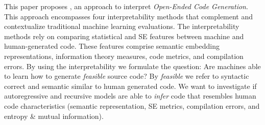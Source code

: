 This paper proposes \CodeGenXplainer, an approach to interpret \textit{Open-Ended Code Generation}. This approach encompasses four interpretability methods that complement and contextualize traditional machine learning evaluations. The interpretability methods rely on comparing statistical and SE features between machine and human-generated code. These features comprise semantic embedding representations, information theory measures, code metrics, and compilation errors. By using the interpretability we formulate the question: Are machines able to learn how to generate \textit{feasible} source code? By \textit{feasible} we refer to syntactic correct and semantic similar to human generated code. We want to investigate if autoregressive and recursive models are able to \textit{infer} code that resembles human code characteristics (\ie semantic representation, SE metrics, compilation errors, and entropy \& mutual information). 